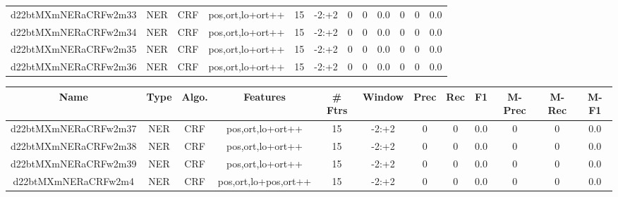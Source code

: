 \documentclass[a4paper]{article}
\begin{document}
\begin{landscape}
\begin{center}
\begin{tabular}{ |c|c|c|c|c|c|c|c|c|c|c|c|}
 
 	
 	\small{ d22btMXmNERaCRFw2m33 } & \small{ NER} & \small{  CRF }  & pos,ort,lo+ort++  &  15 &  \small{  -2:+2 }  &  0 & 0 & 0.0  &  0 & 0 & 0.0 \\
 	

 
 	
 	\small{ d22btMXmNERaCRFw2m34 } & \small{ NER} & \small{  CRF }  & pos,ort,lo+ort++  &  15 &  \small{  -2:+2 }  &  0 & 0 & 0.0  &  0 & 0 & 0.0 \\
 	

 
 	
 	\small{ d22btMXmNERaCRFw2m35 } & \small{ NER} & \small{  CRF }  & pos,ort,lo+ort++  &  15 &  \small{  -2:+2 }  &  0 & 0 & 0.0  &  0 & 0 & 0.0 \\
 	

 
 	
 	\small{ d22btMXmNERaCRFw2m36 } & \small{ NER} & \small{  CRF }  & pos,ort,lo+ort++  &  15 &  \small{  -2:+2 }  &  0 & 0 & 0.0  &  0 & 0 & 0.0 \\
 	
 \hline
\end{tabular}
\end{center}




\begin{center}
\begin{tabular}{ |c|c|c|c|c|c|c|c|c|c|c|c|} 
 \hline
 	Name & Type & Algo. & Features & \# Ftrs & Window & Prec & Rec & F1 & M-Prec & M-Rec & M-F1\\
 \hline

 	

 
 	
 	\small{ d22btMXmNERaCRFw2m37 } & \small{ NER} & \small{  CRF }  & pos,ort,lo+ort++  &  15 &  \small{  -2:+2 }  &  0 & 0 & 0.0  &  0 & 0 & 0.0 \\
 	

 
 	
 	\small{ d22btMXmNERaCRFw2m38 } & \small{ NER} & \small{  CRF }  & pos,ort,lo+ort++  &  15 &  \small{  -2:+2 }  &  0 & 0 & 0.0  &  0 & 0 & 0.0 \\
 	

 
 	
 	\small{ d22btMXmNERaCRFw2m39 } & \small{ NER} & \small{  CRF }  & pos,ort,lo+ort++  &  15 &  \small{  -2:+2 }  &  0 & 0 & 0.0  &  0 & 0 & 0.0 \\
 	

 
 	
 	\small{ d22btMXmNERaCRFw2m4 } & \small{ NER} & \small{  CRF }  & pos,ort,lo+pos,ort++  &  15 &  \small{  -2:+2 }  &  0 & 0 & 0.0  &  0 & 0 & 0.0 \\
 	


\end{tabular}
\end{center}
\end{landscape}
\end{document}
